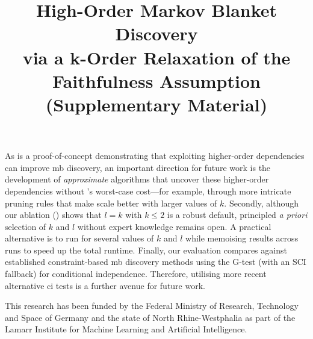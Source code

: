\documentclass[accepted]{uai2026} %
\theoremstyle{plain}
\theoremstyle{definition}
\theoremstyle{remark}
\begin{document}
As {\method} is a proof-of-concept demonstrating that exploiting
higher-order dependencies can improve \gls{mb} discovery, an important
direction for future work is the development of \emph{approximate}
algorithms that uncover these higher-order dependencies without
{\method}'s worst-case cost---for example, through more intricate
pruning rules that make {\method} scale better with larger values of
$k$. Secondly, although our ablation () shows that
$l=k$ with $k\leq 2$ is a robust default, principled \emph{a priori}
selection of $k$ and $l$ without expert knowledge remains open. A
practical alternative is to run {\method} for several values of $k$ and
$l$ while memoising results across runs to speed up the total
runtime. Finally, our evaluation compares against established
constraint-based \gls{mb} discovery methods using the G-test (with an
SCI fallback) for conditional independence. Therefore, utilising more
recent alternative \gls{ci} tests is a further avenue for future work.

\newpage



\begin{acknowledgements} %
  This research has been funded by the Federal Ministry of Research,
  Technology and Space of Germany and the state of North
  Rhine-Westphalia as part of the Lamarr Institute for Machine Learning
  and Artificial Intelligence.
\end{acknowledgements}




\newpage


\title{High-Order Markov Blanket Discovery\\
  via a k-Order Relaxation of the Faithfulness Assumption
  \\(Supplementary Material)}
\maketitle
\appendix


\end{document}
